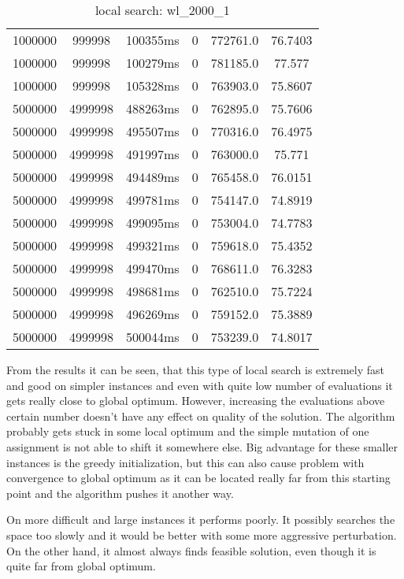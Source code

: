 \documentclass[./main.tex]{subfiles}
\begin{document}
\begin{table}
\begin{tabular}{ c | c | c | c | c | c }
        1000000 & 999998 & 100355ms & 0 & 772761.0 & 76.7403 \\
        1000000 & 999998 & 100279ms & 0 & 781185.0 & 77.577 \\
        1000000 & 999998 & 105328ms & 0 & 763903.0 & 75.8607 \\
        \hline
        5000000 & 4999998 & 488263ms & 0 & 762895.0 & 75.7606 \\
        5000000 & 4999998 & 495507ms & 0 & 770316.0 & 76.4975 \\
        5000000 & 4999998 & 491997ms & 0 & 763000.0 & 75.771 \\
        5000000 & 4999998 & 494489ms & 0 & 765458.0 & 76.0151 \\
        5000000 & 4999998 & 499781ms & 0 & 754147.0 & 74.8919 \\
        5000000 & 4999998 & 499095ms & 0 & 753004.0 & 74.7783 \\
        5000000 & 4999998 & 499321ms & 0 & 759618.0 & 75.4352 \\
        5000000 & 4999998 & 499470ms & 0 & 768611.0 & 76.3283 \\
        \rowcolor{lightgray} 5000000 & 4999998 & 498681ms & 0 & 762510.0 & 75.7224 \\
        5000000 & 4999998 & 496269ms & 0 & 759152.0 & 75.3889 \\
        5000000 & 4999998 & 500044ms & 0 & 753239.0 & 74.8017 \\
    \end{tabular}
    \caption{local search: wl\_2000\_1}
\end{table}

From the results it can be seen, that this type of local search is extremely fast and good on simpler instances and even with quite low number of evaluations it gets really close to global optimum.
However, increasing the evaluations above certain number doesn't have any effect on quality of the solution.
The algorithm probably gets stuck in some local optimum and the simple mutation of one assignment is not able to shift it somewhere else.
Big advantage for these smaller instances is the greedy initialization, but this can also cause problem with convergence to global optimum as it can be located really far from this starting point and the algorithm pushes it another way.

On more difficult and large instances it performs poorly.
It possibly searches the space too slowly and it would be better with some more aggressive perturbation.
On the other hand, it almost always finds feasible solution, even though it is quite far from global optimum.
\end{document}
